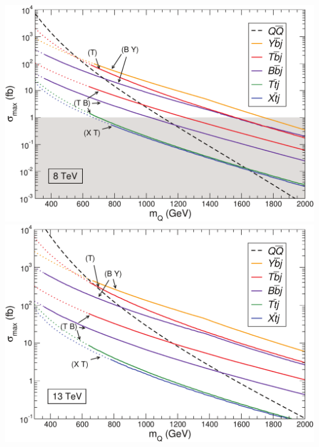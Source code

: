 \begin{frame}
\begin{minipage}{.6\textwidth}
\end{minipage}\begin{minipage}{.4\textwidth}\centering
\includegraphics[width=.85\textwidth]{pics/ja/fig4a}\\
\includegraphics[width=.85\textwidth]{pics/ja/fig4b}
\end{minipage}



\end{frame}
